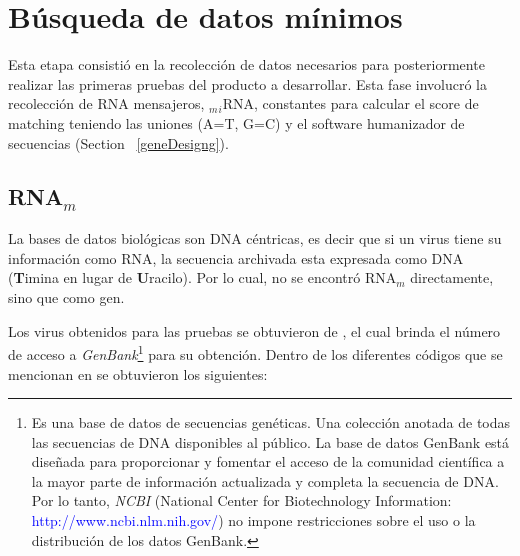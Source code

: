 \documentclass[12pt,a4paper,spanish]{article}
\begin{document}
\section{Búsqueda de datos mínimos}
	\par Esta etapa consistió en la recolección de datos necesarios para posteriormente realizar las primeras pruebas del 		producto a desarrollar. Esta fase involucró la recolección de RNA mensajeros, $_m$$_i$RNA, constantes para calcular el 		score de matching teniendo las uniones (A=T, G=C) y el software humanizador de secuencias (Section ~\ref{geneDesigng}).

	\subsection{RNA$_m$}
		\par La bases de datos biológicas son DNA céntricas, es decir que si un virus tiene su información como RNA, la 		secuencia archivada esta expresada como DNA (\textbf{T}imina en lugar de \textbf{U}racilo). Por lo cual, no se 			encontró RNA$_m$ directamente, sino que como gen.

		\par Los virus obtenidos para las pruebas se obtuvieron de \cite{holmes}, el cual brinda el número de acceso a 			\textit{GenBank}\footnote{Es una base de datos de secuencias genéticas. Una colección anotada de todas las 			secuencias de DNA disponibles al público. La base de datos GenBank está diseñada para proporcionar y fomentar el 			acceso de la comunidad científica a la mayor parte de información actualizada y completa la secuencia de DNA. Por 			lo tanto, \textit{NCBI} (National Center for Biotechnology Information:
		\textcolor{blue}{http://www.ncbi.nlm.nih.gov/}) no impone restricciones sobre el uso o la distribución de los 			datos GenBank.} para su obtención. Dentro de los diferentes códigos que se mencionan en \cite{holmes} se 			obtuvieron los siguientes:
\end{document}
